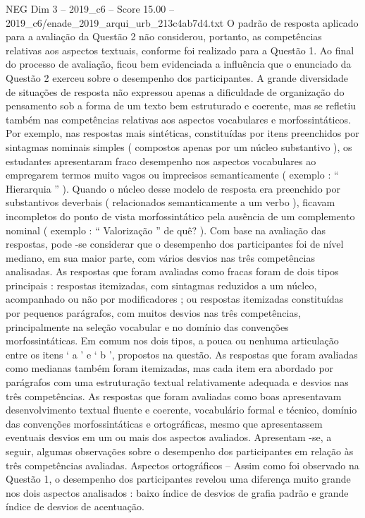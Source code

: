 \begin{textsample}{NEG Dim 3 – 2019\_c6 – Score 15.00 – 2019\_c6/enade\_2019\_arqui\_urb\_213c4ab7d4.txt}
O padrão de resposta aplicado para a avaliação da Questão 2 não considerou, portanto, as competências relativas aos aspectos textuais, conforme foi realizado para a Questão 1.
Ao final do processo de avaliação, ficou bem evidenciada a influência que o enunciado da Questão 2 exerceu sobre o desempenho dos participantes.
A grande diversidade de situações de resposta não expressou apenas a dificuldade de organização do pensamento sob a forma de um texto bem estruturado e coerente, mas se refletiu também nas competências relativas aos aspectos vocabulares e morfossintáticos.
Por exemplo, nas respostas mais sintéticas, constituídas por itens preenchidos por sintagmas nominais simples ( compostos apenas por um núcleo substantivo ), os estudantes apresentaram fraco desempenho nos aspectos vocabulares ao empregarem termos muito vagos ou imprecisos semanticamente ( exemplo : “ Hierarquia ” ).
Quando o núcleo desse modelo de resposta era preenchido por substantivos deverbais ( relacionados semanticamente a um verbo ), ficavam incompletos do ponto de vista morfossintático pela ausência de um complemento nominal ( exemplo : “ Valorização ” de quê? ).
Com base na avaliação das respostas, pode -se considerar que o desempenho dos participantes foi de nível mediano, em sua maior parte, com vários desvios nas três competências analisadas.
As respostas que foram avaliadas como fracas foram de dois tipos principais : respostas itemizadas, com sintagmas reduzidos a um núcleo, acompanhado ou não por modificadores ; ou respostas itemizadas constituídas por pequenos parágrafos, com muitos desvios nas três competências, principalmente na seleção vocabular e no domínio das convenções morfossintáticas.
Em comum nos dois tipos, a pouca ou nenhuma articulação entre os itens ‘ a ’ e ‘ b ’, propostos na questão.
As respostas que foram avaliadas como medianas também foram itemizadas, mas cada item era abordado por parágrafos com uma estruturação textual relativamente adequada e desvios nas três competências.
As respostas que foram avaliadas como boas apresentavam desenvolvimento textual fluente e coerente, vocabulário formal e técnico, domínio das convenções morfossintáticas e ortográficas, mesmo que apresentassem eventuais desvios em um ou mais dos aspectos avaliados.
Apresentam -se, a seguir, algumas observações sobre o desempenho dos participantes em relação às três competências avaliadas.
Aspectos ortográficos – Assim como foi observado na Questão 1, o desempenho dos participantes revelou uma diferença muito grande nos dois aspectos analisados : baixo índice de desvios de grafia padrão e grande índice de desvios de acentuação.

\end{textsample}
